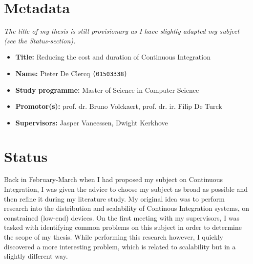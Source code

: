 \newcommand*{\Root}{..}



\onehalfspacing
\newpage

\chapter*{Metadata}
\emph{The title of my thesis is still provisionary as I have slightly adapted my subject (see the Status-section).}

\begin{itemize}
  \item \textbf{Title:} Reducing the cost and duration of Continuous Integration
  \item \textbf{Name:} Pieter De Clercq \texttt{(01503338)}
  \item \textbf{Study programme:} Master of Science in Computer Science
  \item \textbf{Promotor(s):} prof. dr. Bruno Volckaert, prof. dr. ir. Filip De Turck
  \item \textbf{Supervisors:} Jasper Vaneessen, Dwight Kerkhove
\end{itemize}

\chapter*{Status}
Back in February-March when I had proposed my subject on Continuous Integration, I was given the advice to choose my subject as broad as possible and then refine it during my literature study. My original idea was to perform research into the distribution and scalability of Continous Integration systems, on constrained (low-end) devices. On the first meeting with my supervisors, I was tasked with identifying common problems on this subject in order to determine the scope of my thesis. While performing this research however, I quickly discovered a more interesting problem, which is related to scalability but in a slightly different way.\\

